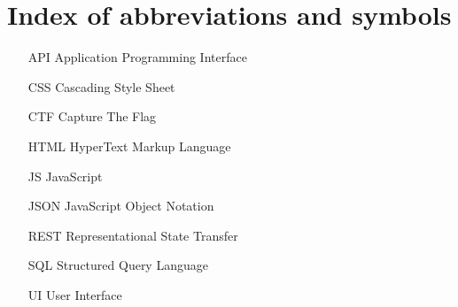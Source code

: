
\chapter{Index of abbreviations and symbols}

\begin{itemize}
	\item[API] Application Programming Interface
	\item[CSS] Cascading Style Sheet
	\item[CTF] Capture The Flag
	\item[HTML] HyperText Markup Language
	\item[JS] JavaScript
	\item[JSON] JavaScript Object Notation
	\item[REST] Representational State Transfer
	\item[SQL] Structured Query Language
	\item[UI] User Interface
\end{itemize}
